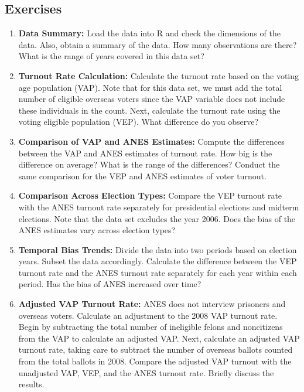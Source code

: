\documentclass[12pt]{article}
\begin{document}
\subsection*{Exercises}

\begin{enumerate}
    \item \textbf{Data Summary:}
    Load the data into R and check the dimensions of the data. Also, obtain a summary of the data. How many observations are there? What is the range of years covered in this data set?

    \item \textbf{Turnout Rate Calculation:} 
    Calculate the turnout rate based on the voting age population (VAP). Note that for this data set, we must add the total number of eligible overseas voters since the VAP variable does not include these individuals in the count. Next, calculate the turnout rate using the voting eligible population (VEP). What difference do you observe?

    \item \textbf{Comparison of VAP and ANES Estimates:} 
    Compute the differences between the VAP and ANES estimates of turnout rate. How big is the difference on average? What is the range of the differences? Conduct the same comparison for the VEP and ANES estimates of voter turnout.

    \item \textbf{Comparison Across Election Types:} 
    Compare the VEP turnout rate with the ANES turnout rate separately for presidential elections and midterm elections. Note that the data set excludes the year 2006. Does the bias of the ANES estimates vary across election types?
    
    \item \textbf{Temporal Bias Trends:}
    Divide the data into two periods based on election years. Subset the data accordingly. Calculate the difference between the VEP turnout rate and the ANES turnout rate separately for each year within each period. Has the bias of ANES increased over time?

    \item \textbf{Adjusted VAP Turnout Rate:}
    ANES does not interview prisoners and overseas voters. Calculate an adjustment to the 2008 VAP turnout rate. Begin by subtracting the total number of ineligible felons and noncitizens from the VAP to calculate an adjusted VAP. Next, calculate an adjusted VAP turnout rate, taking care to subtract the number of overseas ballots counted from the total ballots in 2008. Compare the adjusted VAP turnout with the unadjusted VAP, VEP, and the ANES turnout rate. Briefly discuss the results.
\end{enumerate}
\vspace{0.3cm}
\end{document}
